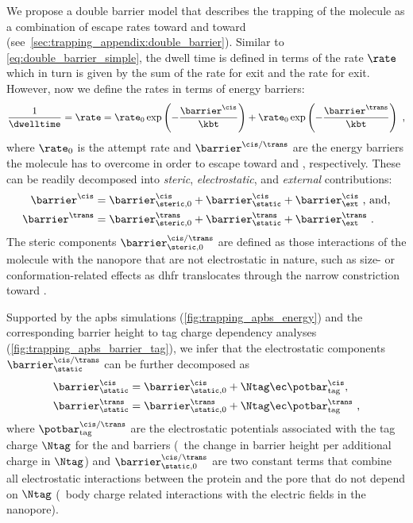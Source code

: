 We propose a double barrier model that describes the trapping of the molecule as a combination of escape rates
toward \cisi{} and toward \transi{} (see~\cref{sec:trapping_appendix:double_barrier}). Similar to
\cref{eq:double_barrier_simple}, the dwell time is defined in terms of the rate $\rate$ which in turn is given
by the sum of the rate for \cisi{} exit and the rate for \transi{} exit. However, now we define the rates in
terms of energy barriers:
%
\begin{align}\label{eq:double_barrier}
    \frac{1}{\dwelltime} = \rate =
        \rate_0 \exp \left( - \dfrac{\barrier^{\cis}}{\kbt} \right)
        + \rate_0 \exp \left( - \dfrac{\barrier^{\trans}}{\kbt} \right)
    \text{ ,}
\end{align}
%
where $\rate_0$ is the attempt rate and $\barrier^{\cis/\trans}$ are the energy barriers the molecule has to
overcome in order to escape toward \cisi{} and \transi{}, respectively. These can be readily decomposed into
\emph{steric}, \emph{electrostatic}, and \emph{external} contributions:
%
\begin{subequations}\label{eq:decomposition}
\begin{align}
  \barrier^{\cis} ={}&
    \barrier^{\cis}_{\steric,0}
    + \barrier^{\cis}_\static
    + \barrier^{\cis}_\ext \text{ , and,} \\
  \barrier^{\trans} ={}&
    \barrier^{\trans}_{\steric,0}
    + \barrier^{\trans}_\static
    + \barrier^{\trans}_\ext
  \text{ .}
\end{align}
\end{subequations}
%
The steric components $\barrier^{\cis/\trans}_{\steric,0}$ are defined as those interactions of the molecule
with the nanopore that are not electrostatic in nature, such as size- or conformation-related effects as
\gls{dhfr} translocates through the narrow constriction toward \transi{}.

Supported by the \gls{apbs} simulations (\cref{fig:trapping_apbs_energy}) and the corresponding barrier
height to tag charge dependency analyses (\cref{fig:trapping_apbs_barrier_tag}), we infer that the
electrostatic components $\barrier^{\cis/\trans}_{\static}$ can be further decomposed as
%
\begin{subequations}\label{eq:static-barrier}
\begin{align}
	\barrier^{\cis}_\static ={}&
			\barrier^{\cis}_{\static,0}
			+ \Ntag \ec \potbar_{\rm{tag}}^{\cis},\\
	\barrier^{\trans}_\static ={}&
			\barrier^{\trans}_{\static,0}
      + \Ntag \ec \potbar_{\rm{tag}}^{\trans}
  \text{ ,}
\end{align}
\end{subequations}
%
where $\potbar_{\rm{tag}}^{\cis/\trans}$ are the electrostatic potentials associated with the tag charge
$\Ntag$ for the \cisi{} and \transi{} barriers (\ie~the change in barrier height per additional charge in
$\Ntag$) and $\barrier^{\cis/\trans}_{\static,0}$ are two constant terms that combine all electrostatic
interactions between the protein and the pore that do not depend on $\Ntag$ (\eg~body charge related
interactions with the electric fields in the nanopore).



